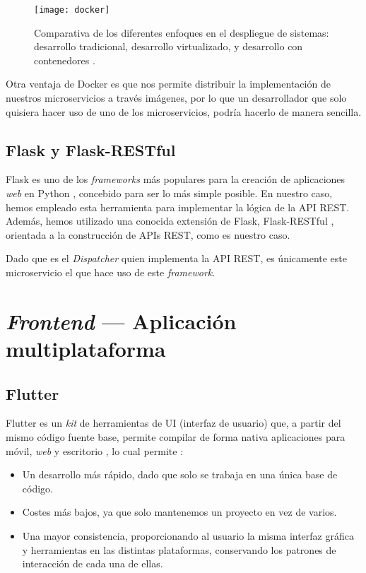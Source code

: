 \begin{figure}[!h]
	\centering
	\texttt{[image: docker]}
	\caption[Diferentes enfoques en el despliegue de sistemas.]{Comparativa de los diferentes enfoques en el despliegue de sistemas: desarrollo tradicional, desarrollo virtualizado, y desarrollo con contenedores \cite{kubernetes}.}
	\label{fig:vm-container}
\end{figure}

Otra ventaja de Docker es que nos permite distribuir la implementación de nuestros microservicios a través imágenes, por lo que un desarrollador que solo quisiera hacer uso de uno de los microservicios, podría hacerlo de manera sencilla.


\subsection{Flask y Flask-RESTful}

Flask es uno de los \emph{frameworks} más populares para la creación de aplicaciones \emph{web} en Python \cite{flask}, concebido para ser lo más simple posible. En nuestro caso, hemos empleado esta herramienta para implementar la lógica de la API REST. Además, hemos utilizado una conocida extensión de Flask, Flask-RESTful \cite{flaskRestful}, orientada a la construcción de APIs REST, como es nuestro caso.

Dado que es el \emph{Dispatcher} quien implementa la API REST, es únicamente este microservicio el que hace uso de este \emph{framework}.


\section{\emph{Frontend} --- Aplicación multiplataforma} \label{sec:frontend}

\subsection{Flutter}

Flutter es un \emph{kit} de herramientas de UI (interfaz de usuario) que, a partir del mismo código fuente base, permite compilar de forma nativa aplicaciones para móvil, \emph{web} y escritorio \cite{flutter-es}, lo cual permite \cite{miola20}:

\vspace{-0.5cm}
\begin{itemize}
	\item [\textbullet] Un desarrollo más rápido, dado que solo se trabaja en una única base de código.
	\item [\textbullet] Costes más bajos, ya que solo mantenemos un proyecto en vez de varios.
	\item [\textbullet] Una mayor consistencia, proporcionando al usuario la misma interfaz gráfica y herramientas en las distintas plataformas, conservando los patrones de interacción de cada una de ellas.
\end{itemize}

